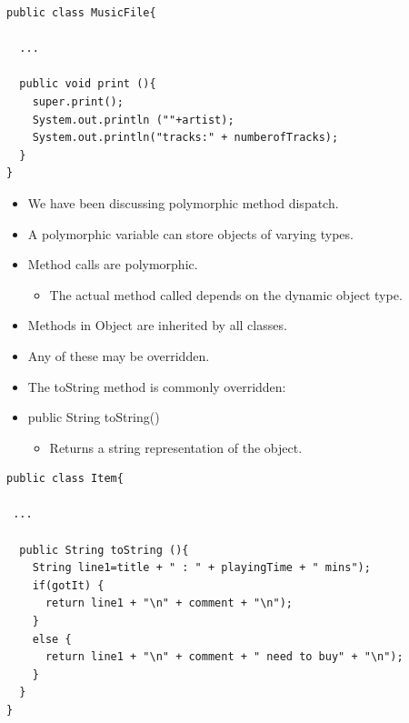 \documentclass{beamer}
\begin{document}
\begin{frame}[fragile]
\begin{block}{}
\begin{lstlisting}
public class MusicFile{

  ...

  public void print (){
    super.print();
    System.out.println (""+artist);
    System.out.println("tracks:" + numberofTracks);
  }
}
\end{lstlisting}
\end{block}
\end{frame}

\begin{frame}
\begin{itemize}
\item We have been discussing polymorphic method dispatch.
\item A polymorphic variable can store objects of varying types.
\item Method calls are polymorphic.
\begin{itemize}
\item The actual method called depends on the dynamic object type.
\end{itemize}
\end{itemize}
\end{frame}

\begin{frame}
\begin{itemize}
\item Methods in Object are inherited by all classes.
\item Any of these may be overridden.
\item The toString method is commonly overridden:
\item public String toString()
\begin{itemize}
\item Returns a string representation of the object.
\end{itemize}
\end{itemize}
\end{frame}

\begin{frame}[fragile]
\begin{block}{}
\begin{lstlisting}
public class Item{
	
 ...
 
  public String toString (){
    String line1=title + " : " + playingTime + " mins");
    if(gotIt) {
      return line1 + "\n" + comment + "\n"); 
    } 
    else {
      return line1 + "\n" + comment + " need to buy" + "\n");
    }
  }
}
\end{lstlisting}
\end{block}
\end{frame}
\end{document}
